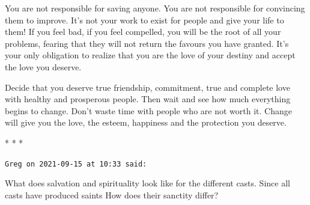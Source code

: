 You are not responsible for saving anyone. You are not responsible for convincing them to improve. It's not your work to exist for people and give your life to them! If you feel bad, if you feel compelled, you will be the root of all your problems, fearing that they will not return the favours you have granted. It's your only obligation to realize that you are the love of your destiny and accept the love you deserve.

Decide that you deserve true friendship, commitment, true and complete love with healthy and prosperous people. Then wait and see how much everything begins to change. Don't waste time with people who are not worth it. Change will give you the love, the esteem, happiness and the protection you deserve.




\begin{center}* * *\end{center}

\begin{footnotesize}\begin{sffamily}



\texttt{Greg on 2021-09-15 at 10:33 said: }

What does salvation and spirituality look like for the different casts. Since all casts have produced saints How does their sanctity differ?


\end{sffamily}\end{footnotesize}
